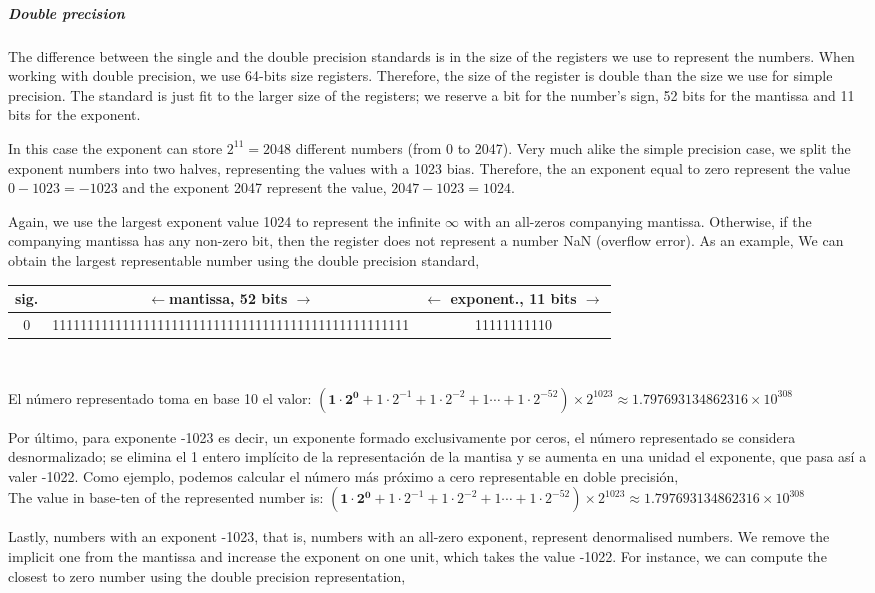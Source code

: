\begin{paracol}{2}
\subparagraph{Double precision}
 The difference between the single and the double precision standards is in the size of the registers we use to represent the numbers. When working with double precision, we use 64-bits size registers. Therefore, the size of the register is double than the size we use for simple precision. The standard is just fit to the larger size of the registers; we reserve a bit for the number's sign, 52 bits for the mantissa and 11 bits for the exponent.

In this case the exponent can store $2^{11}=2048$ different numbers (from 0 to 2047). Very much alike the simple precision case, we split the  exponent numbers into two halves, representing the values with a 1023 bias. Therefore, the an exponent equal to zero represent the value  $0-1023=-1023$ and the exponent 2047 represent the value, $2047-1023=1024$.

Again, we use the largest exponent value 1024 to represent the infinite $\infty$ with an all-zeros companying mantissa. Otherwise, if the companying mantissa has any non-zero bit, then the register does not represent a number NaN (overflow error). As an example, We can obtain the largest representable number using the double precision standard,     

\end{paracol}
\begin{tabular}{|c||c||c|}
\hline
sig.&$\leftarrow$mantissa, 52 bits $\rightarrow$&$\leftarrow$ exponent., 11 bits $\rightarrow$\\
\hline
0&111111111111111111111111111111111111111111111111111&11111111110\\
\hline
\end{tabular}\\
\begin{paracol}{2}
El número representado toma en base 10 el valor: $(\mathbf{1\cdot2^0}+1\cdot2^{-1}+1\cdot2^{-2}+1\cdots+1\cdot2^{-52})\times2^{1023}\approx 1.797693134862316\times10^{308}$

Por último, para exponente -1023 es decir, un exponente formado exclusivamente por ceros, el número representado se considera desnormalizado; se elimina el 1 entero implícito de la representación de la mantisa y se aumenta en una unidad el exponente, que pasa así a valer -1022.  Como ejemplo, podemos calcular el número más próximo a cero representable en doble precisión,\\

\switchcolumn
The value in base-ten of the represented number is: $(\mathbf{1\cdot2^0}+1\cdot2^{-1}+1\cdot2^{-2}+1\cdots+1\cdot2^{-52})\times2^{1023}\approx 1.797693134862316\times10^{308}$

Lastly, numbers with an exponent -1023, that is, numbers with an all-zero exponent, represent denormalised numbers. We remove the implicit one from the mantissa and increase the exponent on one unit, which takes the value -1022. For instance, we can compute the closest to zero number using the double precision representation,  
\end{paracol}
